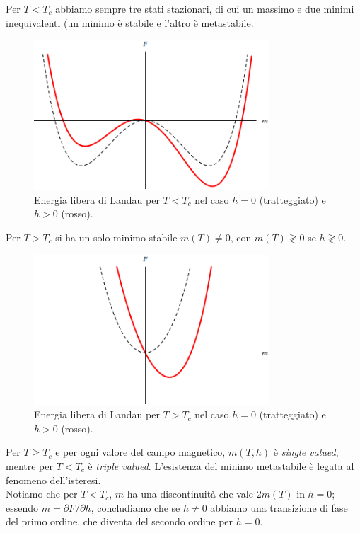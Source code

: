 \documentclass[10pt,a4paper]{report}
\theoremstyle{definition}
\numberwithin{equation}{section}
\begin{document}
Per $T<T_c$ abbiamo sempre tre stati stazionari, di cui un massimo e due minimi inequivalenti (un minimo è stabile e l'altro è metastabile.

\begin{figure}[h]
\centering
\includegraphics[width=250pt,keepaspectratio=true]{Addons/fhnotzero.png}
\caption{\footnotesize{Energia libera di Landau per $T<T_c$ nel caso $h=0$ (tratteggiato) e $h>0$ (rosso).}}

\end{figure}

Per $T>T_c$ si ha un solo minimo stabile $m(T)\ne 0$, con $m(T)\gtrless 0$ se $h\gtrless 0$.

\begin{figure}[h]
\centering
\includegraphics[width=250pt,keepaspectratio=true]{Addons/para.png}
\caption{Energia libera di Landau per $T>T_c$ nel caso $h=0$ (tratteggiato) e $h>0$ (rosso).}

\end{figure}

Per $T\ge T_c$ e per ogni valore del campo magnetico, $m(T,h)$ è \emph{single valued}, mentre per $T<T_c$ è \emph{triple valued}. L'esistenza del minimo metastabile è legata al fenomeno dell'isteresi.\\
Notiamo che per $T<T_c$, $m$ ha una discontinuità che vale $2m(T)$ in $h=0$; essendo $m=\partial F/\partial h$, concludiamo che se $h\ne 0$ abbiamo una transizione di fase del primo ordine, che diventa del secondo ordine per $h=0$.
\end{document}
